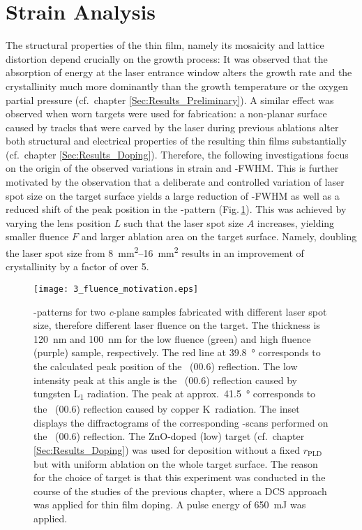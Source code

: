 \section{Strain Analysis}
    \label{Sec:Results_Energy}
The structural properties of the thin film, namely its mosaicity and lattice distortion depend crucially on the growth process:
It was observed that the absorption of energy at the laser entrance window alters the growth rate and the crystallinity much more dominantly than the growth temperature or the oxygen partial pressure (cf.\ chapter \ref{Sec:Results_Preliminary}).
A similar effect was observed when worn targets were used for fabrication:
a non-planar surface caused by tracks that were carved by the laser during previous ablations alter both structural and electrical properties of the resulting thin films substantially (cf.\ chapter \ref{Sec:Results_Doping}).
Therefore, the following investigations focus on the origin of the observed variations in strain and \textomega-FWHM.
This is further motivated by the observation that a deliberate and controlled variation of laser spot size on the target surface yields a large reduction of \textomega-FWHM as well as a reduced shift of the peak position in the \thetaomega-pattern (Fig.\,\ref{Fig:Results_3_motivation}).
This was achieved by varying the lens position $L$ such that the laser spot size $A$ increases, yielding smaller fluence $F$ and larger ablation area on the target surface.
Namely, doubling the laser spot size from \qtyrange{8}{16}{\mm\squared} results in an improvement of crystallinity by a factor of over 5.
\begin{figure}[h]
    \centering
    \texttt{[image: 3\_fluence\_motivation.eps]}
    \caption{
    \thetaomega-patterns for two \textit{c}-plane samples fabricated with different laser spot size, therefore different laser fluence on the target.
    The thickness is \qty{120}{\nm} and \qty{100}{\nm} for the low fluence (green) and high fluence (purple) sample, respectively.
    The red line at \qty{39.8}{\degree} corresponds to the calculated peak position of the \cro\ (00.6) reflection.
    The low intensity peak at this angle is the \alo\ (00.6) reflection caused by tungsten L\textalpha\textsubscript{1} radiation.
    The peak at approx.\ \qty{41.5}{\degree} corresponds to the \alo\ (00.6) reflection caused by copper K\textalpha\ radiation.
    The inset displays the diffractograms of the corresponding \textomega-scans performed on the \cro\ (00.6) reflection.
    The ZnO-doped (low) target (cf.\ chapter \ref{Sec:Results_Doping}) was used for deposition without a fixed $r_\mathrm{PLD}$ but with uniform ablation on the whole target surface.
    The reason for the choice of target is that this experiment was conducted in the course of the studies of the previous chapter, where a DCS approach was applied for thin film doping.
    A pulse energy of \qty{650}{\milli\J} was applied.
    }
    \label{Fig:Results_3_motivation}
\end{figure}

